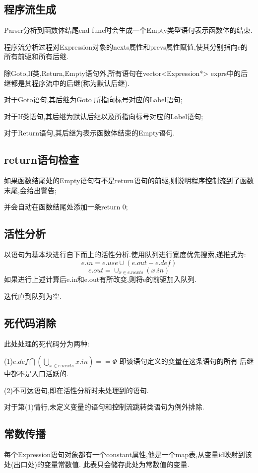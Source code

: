 \documentclass[UTF8]{article}
\begin{document}
\subsection{程序流生成}
Parser分析到函数体结尾end func时会生成一个Empty类型语句表示函数体的结束.

程序流分析过程对Expression对象的nexts属性和prevs属性赋值,使其分别指向e的所有前驱和所有后继.

除Goto,If类,Return,Empty语句外,所有语句在vector<Expression*> exprs中的后继都是其程序流中的后继(称为默认后继).

对于Goto语句,其后继为Goto 所指向标号对应的Label语句;

对于If类语句,其后继为默认后继以及所指向标号对应的Label语句;

对于Return语句,其后继为表示函数体结束的Empty语句.

\subsection{return语句检查}
如果函数结尾处的Empty语句有不是return语句的前驱,则说明程序控制流到了函数末尾,会给出警告;

并会自动在函数结尾处添加一条return 0;
\subsection{活性分析}
以语句为基本块进行自下而上的活性分析.使用队列进行宽度优先搜索,递推式为:
$$e.in = e.use\cup (e.out - e.def)$$
$$e.out = \cup_{x\in e.nexts} (x.in)$$
如果进行上述计算后e.in和e.out有所改变,则将e的前驱加入队列.

迭代直到队列为空.

\subsection{死代码消除}
此处处理的死代码分为两种:

(1)$e.def \bigcap\left( \bigcup_{x\in e.nexts}x.in \right)== \Phi$ 即该语句定义的变量在这条语句的所有
后继中都不是入口活跃的.

(2)不可达语句,即在活性分析时未处理到的语句.

对于第(1)情行,未定义变量的语句和控制流跳转类语句为例外排除.

\subsection{常数传播}
每个Expression语句对象都有一个constant属性,他是一个map表,从变量id映射到该处(出口处)的变量常数值. 此表只会储存此处为常数值的变量.
\end{document}
